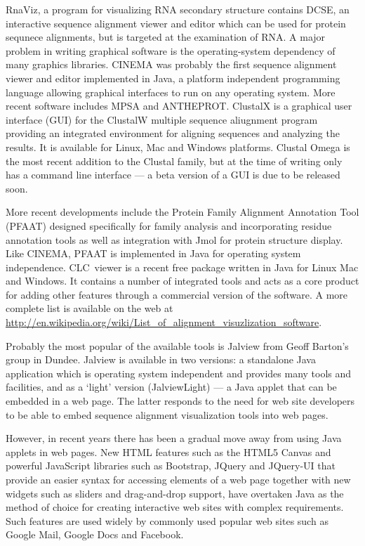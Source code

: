 \documentclass[a4]{bioinfo}
\begin{document}
RnaViz\cite{derijk:rnaviz}, a program for visualizing RNA
secondary structure contains DCSE\cite{derijk:dcse}, an interactive
sequence alignment viewer and editor which can be used for protein
sequnece alignments, but is targeted at the examination of RNA. A
major problem in writing graphical software is the operating-system
dependency of many graphics libraries. CINEMA\cite{parrysmith:cinema}
was probably the first sequence alignment viewer and editor
implemented in Java, a platform independent programming language
allowing graphical interfaces to run on any operating system. More
recent software includes MPSA\cite{blanchet:mpsa} and ANTHEPROT\cite{deleage:antheprot}.
ClustalX\cite{thompson:clustalx} is a graphical user interface (GUI)
for the ClustalW multiple sequence aliugnment program providing an
integrated environment for aligning sequences and analyzing the
results. It is available for Linux, Mac and Windows platforms. Clustal
Omega is the most recent addition to the Clustal family, but at the
time of writing only has a command line interface --- a beta version
of a GUI is due to be released soon.

More recent developments include the Protein Family Alignment
Annotation Tool (PFAAT)\cite{johnson:pfaat} designed specifically for
family analysis and incorporating residue annotation tools as well as
integration with Jmol for protein structure display. Like CINEMA,
PFAAT is implemented in Java for operating system
independence. CLC~viewer is a recent free package written in Java for
Linux Mac and Windows. It contains a number of integrated tools and
acts as a core product for adding other features through a commercial
version of the software. A more
complete list is available on the web at
\url{http://en.wikipedia.org/wiki/List_of_alignment_visuzlization_software}.

Probably the most popular of the available tools is Jalview from Geoff
Barton's group in Dundee. Jalview is available in two versions: a
standalone Java application which is operating system independent and
provides many tools and facilities, and as a `light' version
(JalviewLight) --- a Java applet that can be embedded in a web
page. The latter responds to the need for web site developers to be
able to embed sequence alignment visualization tools into web pages.

However, in recent years there has been a gradual move away from using
Java applets in web pages. New HTML features such as the HTML5 Canvas
and powerful JavaScript libraries such as Bootstrap, JQuery and
JQuery-UI that provide an easier syntax for accessing elements of a
web page together with new widgets such as sliders and drag-and-drop
support, have overtaken Java as the method of choice for creating
interactive web sites with complex requirements. Such features are
used widely by commonly used popular web sites such as Google Mail,
Google Docs and Facebook.
\end{document}
